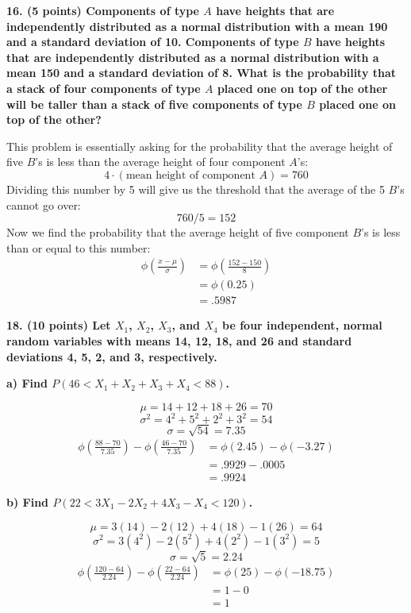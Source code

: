 \documentclass[12pt, letter]{article}
\begin{document}
\pagebreak

\textbf{16. (5 points) Components of type $A$ have heights that are independently distributed as a normal distribution with a mean 190 and a standard deviation of 10. Components of type $B$ have heights that are independently distributed as a normal distribution with a mean 150 and a standard deviation of 8. What is the probability that a stack of four components of type $A$ placed one on top of the other will be taller than a stack of five components of type $B$ placed one on top of the other?}
\begin{center}
	This problem is essentially asking for the probability that the average height of five $B$'s is less than the average height of four component $A$'s:
	$$4 \cdot (\text{mean height of component }A) = 760$$
	Dividing this number by 5 will give us the threshold that the average of the 5 $B$'s cannot go over:
	$$760 / 5 = 152$$
	Now we find the probability that the average height of five component $B$'s is less than or equal to this number:
	\begin{align*}
		\phi \left(\frac{x - \mu}{\sigma}\right) &= \phi \left(\frac{152 - 150}{8}\right) \\
		&= \phi(0.25) \\
		&= \boxed{.5987}
	\end{align*}
\end{center}

\textbf{18. (10 points) Let $X_{1}$, $X_{2}$, $X_{3}$, and $X_{4}$ be four independent, normal random variables with means 14, 12, 18, and 26 and standard deviations 4, 5, 2, and 3, respectively.}

\qquad \textbf{a) Find $P(46<X_{1}+X_{2}+X_{3}+X_{4}<88)$.}
\begin{center}
	$$\mu = 14 + 12 + 18 + 26 = 70$$
	$$\sigma^{2} = 4^{2} + 5^{2} + 2^{2} + 3^{2} = 54$$
	$$\sigma = \sqrt{54} = 7.35$$
	\begin{align*}
		\phi \left(\frac{88 - 70}{7.35}\right) - \phi \left(\frac{46 - 70}{7.35}\right) &= \phi(2.45) - \phi(-3.27) \\
		&= .9929 - .0005 \\
		&= \boxed{.9924}
	\end{align*}
\end{center}

\qquad \textbf{b) Find $P(22<3X_{1}-2X_{2}+4X_{3}-X_{4}<120)$.}
\begin{center}
	$$\mu = 3(14) - 2(12) + 4(18) - 1(26) = 64$$
	$$\sigma^{2} = 3(4^{2}) - 2(5^{2}) + 4(2^{2}) - 1(3^{2}) = 5$$
	$$\sigma = \sqrt{5} = 2.24$$
	\begin{align*}
		\phi \left(\frac{120 - 64}{2.24}\right) - \phi \left(\frac{22 - 64}{2.24}\right) &= \phi(25) - \phi(-18.75) \\
		&= 1 - 0 \\
		&= \boxed{1}
	\end{align*}
\end{center}
\end{document}
